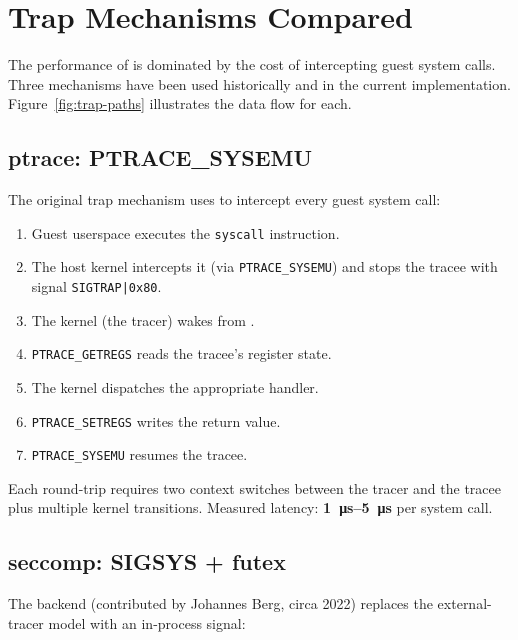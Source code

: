 \section{Trap Mechanisms Compared}
\label{sec:foundations:trap-compare}

The performance of \UML{} is dominated by the cost of intercepting
guest system calls.  Three mechanisms have been used historically and
in the current implementation.  Figure~\ref{fig:trap-paths} illustrates
the data flow for each.

\subsection{ptrace: PTRACE\_SYSEMU}

The original \UML{} trap mechanism uses  to intercept
every guest system call:

\begin{enumerate}
  \item Guest userspace executes the \texttt{syscall} instruction.
  \item The host kernel intercepts it (via \texttt{PTRACE\_SYSEMU})
        and stops the tracee with signal \texttt{SIGTRAP|0x80}.
  \item The \UML{} kernel (the tracer) wakes from .
  \item \texttt{PTRACE\_GETREGS} reads the tracee's register state.
  \item The \UML{} kernel dispatches the appropriate handler.
  \item \texttt{PTRACE\_SETREGS} writes the return value.
  \item \texttt{PTRACE\_SYSEMU} resumes the tracee.
\end{enumerate}

Each round-trip requires two context switches between the tracer and
the tracee plus multiple kernel transitions.  Measured latency:
\textbf{\SIrange{1}{5}{\micro\second}} per system call.

\subsection{seccomp: SIGSYS + futex}

The \Seccomp{} backend (contributed by Johannes Berg, circa 2022)
replaces the external-tracer model with an in-process signal:

